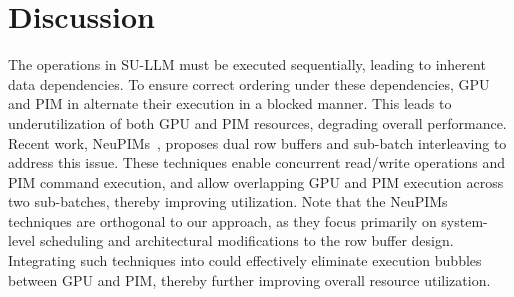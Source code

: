 \section{Discussion}
\label{sec:discussion}
%
%
The operations in SU-LLM must be executed sequentially, leading to
inherent data dependencies.
%
To ensure correct ordering under these dependencies, GPU and PIM in
\sysname{} alternate their execution in a blocked manner.
%
This leads to underutilization of both GPU and PIM resources,
degrading overall performance.
%
Recent work, NeuPIMs~\cite{heo2024neupims}, proposes dual row
buffers and sub-batch interleaving to address this issue.
%
These techniques enable concurrent read/write operations and PIM
command execution, and allow overlapping GPU and PIM execution
across two sub-batches, thereby improving utilization.
%
Note that the NeuPIMs techniques are orthogonal to our approach, as
they focus primarily on system-level scheduling and architectural
modifications to the row buffer design.
%
Integrating such techniques into \sysname{} could effectively
eliminate execution bubbles between GPU and PIM, thereby further
improving overall resource utilization.
%
